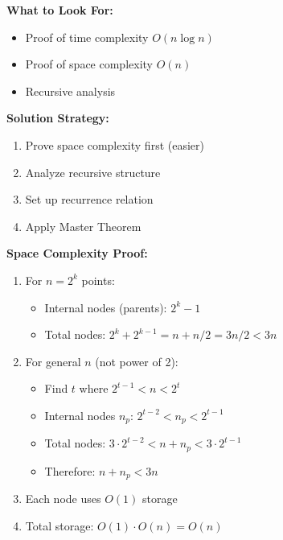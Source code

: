 \textbf{What to Look For:}
\begin{itemize}[noitemsep,leftmargin=*]
    \item Proof of time complexity $O(n\log n)$
    \item Proof of space complexity $O(n)$
    \item Recursive analysis
\end{itemize}

\textbf{Solution Strategy:}
\begin{enumerate}[leftmargin=*,noitemsep]
    \item Prove space complexity first (easier)
    \item Analyze recursive structure
    \item Set up recurrence relation
    \item Apply Master Theorem
\end{enumerate}

\textbf{Space Complexity Proof:}
\begin{enumerate}[leftmargin=*,noitemsep]
    \item For $n = 2^k$ points:
        \begin{itemize}[noitemsep,topsep=0pt]
            \item Internal nodes (parents): $2^k - 1$
            \item Total nodes: $2^k + 2^{k-1} = n + n/2 = 3n/2 < 3n$
        \end{itemize}
    \item For general $n$ (not power of 2):
        \begin{itemize}[noitemsep,topsep=0pt]
            \item Find $t$ where $2^{t-1} < n < 2^t$
            \item Internal nodes $n_p$: $2^{t-2} < n_p < 2^{t-1}$
            \item Total nodes: $3 \cdot 2^{t-2} < n + n_p < 3 \cdot 2^{t-1}$
            \item Therefore: $n + n_p < 3n$
        \end{itemize}
    \item Each node uses $O(1)$ storage
    \item Total storage: $O(1) \cdot O(n) = O(n)$
\end{enumerate}

